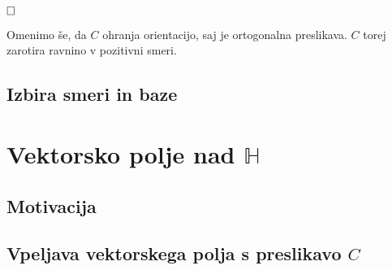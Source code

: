 \documentclass[a4paper,12pt]{article}
\def\N{\mathbb{N}} %
\def\H{\mathbb{H}} %
\def\qed{$\hfill\Box$}   %
\newtheorem{definicija}{Definicija}
\newtheorem{zgled}{Zgled}
\begin{document}
\qed

Omenimo še, da $C$ ohranja orientacijo, saj je ortogonalna preslikava. $C$ torej zarotira ravnino v pozitivni smeri.

\subsection{Izbira smeri in baze}
\section{Vektorsko polje nad $\H$}
\subsection*{Motivacija}
\subsection{Vpeljava vektorskega polja s preslikavo $C$}






\end{document}
